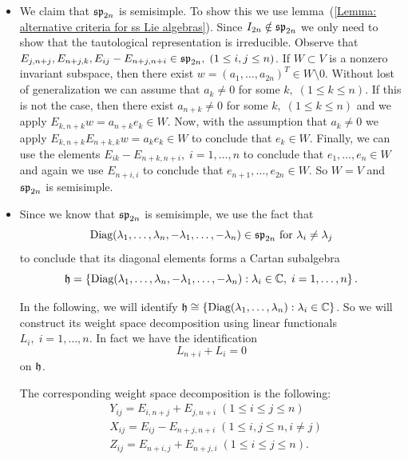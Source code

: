 \begin{itemize}
    \item We claim that $\mathfrak{sp}_{2n}$ is semisimple. To show this we use lemma~(\ref{Lemma: alternative criteria for ss Lie algebras}). 
    Since $I_{2n}\notin\mathfrak{sp}_{2n}$ we only need to show that the tautological representation is irreducible. Observe that
    $E_{j,n+j},E_{n+j,k},E_{ij}-E_{n+j,n+i}\in\mathfrak{sp}_{2n},\;(1\leq i,j\leq n)$. If $W\subset V$ is a nonzero invariant subspace, then 
    there exist $w=(a_1,\dots,a_{2n})^T\in W\setminus0$. Without lost of generalization we can assume that $a_k\neq0$ for some 
    $k,\;(1\leq k\leq n)$. If this is not the case, then there exist $a_{n+k}\neq0$ for some $k,\;(1\leq k\leq n)$ and we apply 
    $E_{k,n+k}w=a_{n+k}e_k\in W$. Now, with the assumption that $a_k\neq0$ we apply $E_{k,n+k}E_{n+k,k}w=a_ke_k\in W$ to conclude that 
    $e_k\in W$. Finally, we can use the elements $E_{ik}-E_{n+k,n+i},\;i=1,\dots, n$ to conclude that $e_1,\dots, e_n\in W$ and again 
    we use $E_{n+i,i}$ to conclude that $e_{n+1},\dots, e_{2n}\in W$. So $W=V$ and $\mathfrak{sp}_{2n}$ is semisimple. 
    \item Since we know that $\mathfrak{sp}_{2n}$ is semisimple, we use the fact that 
    \begin{equation}
        \text{Diag}(\lambda_1,\dots,\lambda_n,-\lambda_1,\dots,-\lambda_n)\in\mathfrak{sp}_{2n}\text{ for }\lambda_i\neq\lambda_j
    \end{equation}
   to conclude that its diagonal elements forms a Cartan subalgebra 
    \begin{equation}
        \mathfrak{h}=\left\{\text{Diag}(\lambda_1,\dots,\lambda_n,-\lambda_1,\dots,-\lambda_n) : \lambda_i\in\mathbb{C},\;i=1,\dots,n \right\}.
    \end{equation}
\begin{dang}
    \begin{remark}
        In the following, we will identify $\mathfrak{h}\cong \{\text{Diag}(\lambda_1,\dots,\lambda_n):\lambda_i\in\mathbb{C}\}$. So we will 
        construct its weight space decomposition using linear functionals $L_i,\;i=1,\dots,n$. In fact we have the identification
        \begin{equation}
            L_{n+i}+L_i =0
        \end{equation}
        on $\mathfrak{h}$.
    \end{remark}
\end{dang}

    The corresponding weight space decomposition is the following:
    \begin{equation}
        \begin{aligned}
            &Y_{ij}=E_{i,n+j}+E_{j,n+i}\;(1\leq i\leq j\leq n)\\
            &X_{ij}=E_{ij}-E_{n+j,n+i}\;(1\leq i,j\leq n, i\neq j) \\
            &Z_{ij}=E_{n+i,j}+E_{n+j,i}\;(1\leq i\leq j\leq n).
        \end{aligned}
    \end{equation}


\end{itemize}
